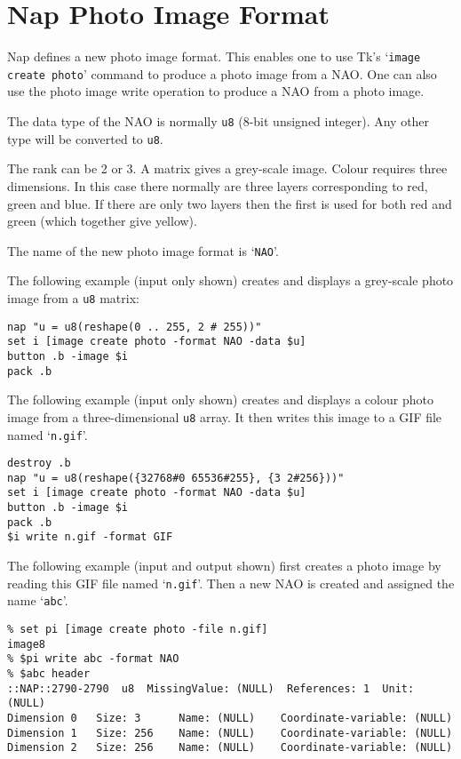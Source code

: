 
\section{Nap Photo Image Format}
    \label{photo}

  Nap defines a new photo image format. This enables one to
  use Tk's `\texttt{image create photo}' command to produce a photo
  image from a NAO. One can also use the photo image write operation to
  produce a NAO from a photo image.
  

The data type of the NAO is normally 
  \texttt{u8} (8-bit unsigned integer). Any other type will be
  converted to 
  \texttt{u8}.
  

The rank can be 2 or 3. A matrix gives a grey-scale image. Colour
  requires three dimensions. In this case there normally are three
  layers corresponding to red, green and blue. If there are only two
  layers then the first is used for both red and green (which together
  give yellow).
  

The name of the new photo image format is `\texttt{NAO}'.
  

The following example (input only shown) creates and displays a
  grey-scale photo image from a 
  \texttt{u8} matrix:
  \begin{verbatim}
nap "u = u8(reshape(0 .. 255, 2 # 255))"
set i [image create photo -format NAO -data $u]
button .b -image $i
pack .b
\end{verbatim}

  

The following example (input only shown) creates and displays a
  colour photo image from a three-dimensional 
  \texttt{u8} array. It then writes this image to a GIF file named
  `\texttt{n.gif}'.
  \begin{verbatim}
destroy .b
nap "u = u8(reshape({32768#0 65536#255}, {3 2#256}))"
set i [image create photo -format NAO -data $u]
button .b -image $i
pack .b
$i write n.gif -format GIF
\end{verbatim}

  

The following example (input and output shown) first creates a
  photo image by reading this GIF file named `\texttt{n.gif}'. Then a new NAO is created and assigned the
  name `\texttt{abc}'.
  \begin{verbatim}
% set pi [image create photo -file n.gif]
image8
% $pi write abc -format NAO
% $abc header
::NAP::2790-2790  u8  MissingValue: (NULL)  References: 1  Unit: (NULL)
Dimension 0   Size: 3      Name: (NULL)    Coordinate-variable: (NULL)
Dimension 1   Size: 256    Name: (NULL)    Coordinate-variable: (NULL)
Dimension 2   Size: 256    Name: (NULL)    Coordinate-variable: (NULL)
\end{verbatim}

